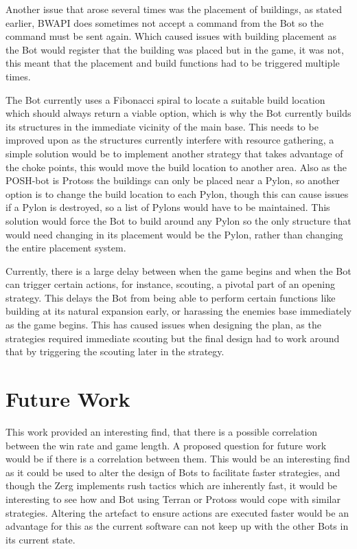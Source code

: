\documentclass[journal]{IEEEtran}
\begin{document}
	Another issue that arose several times was the placement of buildings, as stated earlier, BWAPI does sometimes not accept a command from the Bot so the command must be sent again. Which caused issues with building placement as the Bot would register that the building was placed but in the game, it was not, this meant that the placement and build functions had to be triggered multiple times. 
	
	The Bot currently uses a Fibonacci spiral to locate a suitable build location which should always return a viable option, which is why the Bot currently builds its structures in the immediate vicinity of the main base. This needs to be improved upon as the structures currently interfere with resource gathering, a simple solution would be to implement another strategy that takes advantage of the choke points, this would move the build location to another area. Also as the POSH-bot is Protoss the buildings can only be placed near a Pylon, so another option is to change the build location to each Pylon, though this can cause issues if a Pylon is destroyed, so a list of Pylons would have to be maintained. This solution would force the Bot to build around any Pylon so the only structure that would need changing in its placement would be the Pylon, rather than changing the entire placement system.
	
	Currently, there is a large delay between when the game begins and when the Bot can trigger certain actions, for instance, scouting, a pivotal part of an opening strategy. This delays the Bot from being able to perform certain functions like building at its natural expansion early, or harassing the enemies base immediately as the game begins. This has caused issues when designing the plan, as the strategies required immediate scouting but the final design had to work around that by triggering the scouting later in the strategy.    
	
	\section{Future Work}
	This work provided an interesting find, that there is a possible correlation between the win rate and game length. A proposed question for future work would be if there is a correlation between them. This would be an interesting find as it could be used to alter the design of Bots to facilitate faster strategies, and though the Zerg implements rush tactics which are inherently fast, it would be interesting to see how and Bot using Terran or Protoss would cope with similar strategies.
	Altering the artefact to ensure actions are executed faster would be an advantage for this as the current software can not keep up with the other Bots in its current state.
	
\end{document}
